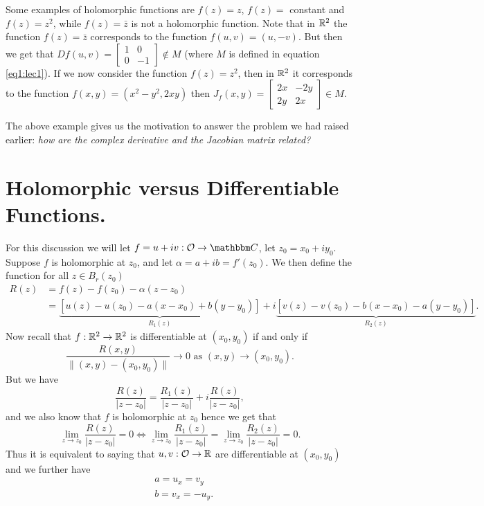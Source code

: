 \documentclass[../ComplexAnalysis_Notes.tex]{subfiles}
\begin{document}
\begin{Eg}{}{}
  Some examples of holomorphic functions are $f(z) = z$, $f(z) = $ constant and $f(z) = z^2$, while $f(z) = \bar{z}$ is not a holomorphic function. Note that in $\mathbb{R}^2$ the function $f(z) = \bar{z}$ corresponds to the function $f(u,v) = (u,-v)$. But then we get that $Df(u,v) = \begin{bmatrix}
      1 & 0 \\ 0 & -1
    \end{bmatrix} \notin M$ (where $M$ is defined in equation \ref{eq1:lec1}). If we now consider the function $f(z) = z^2$, then in $\mathbb{R}^2$ it corresponds to the function $f(x,y) = (x^2 - y^2, 2xy)$ then $J_f(x,y) = \begin{bmatrix}
      2x & -2y \\ 2y & 2x
    \end{bmatrix} \in M$.
\end{Eg}

The above example gives us the motivation to answer the problem we had raised earlier: \textit{how are the complex derivative and the Jacobian matrix related?}

\section{Holomorphic versus Differentiable Functions.}

For this discussion we will let $f = u + iv : \mO \to \C$, let $z_0 = x_0 + i y_0$. Suppose $f$ is holomorphic at $z_0$, and let $\alpha = a + i b = f'(z_0)$. We then define the function for all $z \in B_r(z_0)$
\begin{align*}
  R(z) & = f(z) - f(z_0) - \alpha (z-z_0)                                                                                                 \\
       & = \underbrace{[u(z) - u(z_0) - a(x-x_0) + b(y-y_0)]}_{R_1(z)} + i \underbrace{[v(z) - v(z_0) - b(x-x_0) - a(y - y_0)]}_{R_2(z)}.
\end{align*}
Now recall that $f : \mathbb{R}^2 \to \mathbb{R}^2$ is differentiable at $(x_0,y_0)$ if and only if
\[
  \frac{R(x,y)}{\| (x,y) - (x_0,y_0) \|} \to 0 \mbox{ as } (x,y) \to (x_0,y_0).
\]
But we have
\[
  \frac{R(z)}{|z-z_0|} = \frac{R_1(z)}{|z-z_0|} + i \frac{R(z)}{|z-z_0|},
\]
and we also know that $f$ is holomorphic at $z_0$ hence we get that
\[
  \lim_{z \to z_0} \frac{R(z)}{|z-z_0|} = 0 \Leftrightarrow \lim_{z \to z_0} \frac{R_1(z)}{|z-z_0|} = \lim_{z \to z_0} \frac{R_2(z)}{|z-z_0|} = 0.
\]
Thus it is equivalent to saying that $u,v : \mathcal{O} \to \mathbb{R}$ are differentiable at $(x_0,y_0)$ and we further have
\begin{align*}
   & a = u_x = v_y    \\
   & b = v_x = - u_y.
\end{align*}
\end{document}
